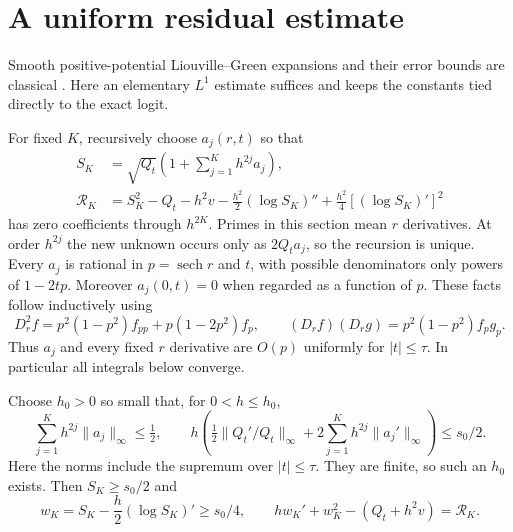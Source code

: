 \documentclass[10pt]{article}
\newcommand{\sech}{\operatorname{sech}}
\begin{document}
\section{A uniform residual estimate}

Smooth positive-potential Liouville--Green expansions and their
error bounds are classical \cite{dlmf,dunster}. Here an elementary
$L^1$ estimate suffices and keeps the constants tied directly to
the exact logit.

For fixed $K$, recursively choose $a_j(r,t)$ so that
\begin{align}
S_K&=\sqrt{Q_t}\left(1+\sum_{j=1}^Kh^{2j}a_j\right),\label{eq:S}\\
\mathcal R_K&=S_K^2-Q_t-h^2v
 -\frac{h^2}2(\log S_K)''
 +\frac{h^2}4[(\log S_K)']^2\label{eq:residual}
\end{align}
has zero coefficients through $h^{2K}$. Primes in this section
mean $r$ derivatives. At order $h^{2j}$ the new unknown occurs
only as $2Q_t a_j$, so the recursion is unique. Every $a_j$ is
rational in $p=\sech r$ and $t$, with possible denominators only
powers of $1-2tp$. Moreover $a_j(0,t)=0$ when regarded as a
function of $p$. These facts follow inductively using
\begin{equation}
D_r^2f=p^2(1-p^2)f_{pp}+p(1-2p^2)f_p,
\qquad (D_rf)(D_rg)=p^2(1-p^2)f_pg_p.
\label{eq:derivativealgebra}
\end{equation}
Thus $a_j$ and every fixed $r$ derivative are $O(p)$ uniformly
for $|t|\le\tau$. In particular all integrals below converge.

Choose $h_0>0$ so small that, for $0<h\le h_0$,
\begin{equation}
\sum_{j=1}^Kh^{2j}\|a_j\|_\infty\le\tfrac12,
\qquad
h\left(\tfrac12\|Q_t'/Q_t\|_\infty+
       2\sum_{j=1}^Kh^{2j}\|a_j'\|_\infty\right)\le s_0/2.
\label{eq:hsmall}
\end{equation}
Here the norms include the supremum over $|t|\le\tau$.
They are finite, so such an $h_0$ exists. Then $S_K\ge s_0/2$ and
\begin{equation}
w_K=S_K-\frac h2(\log S_K)'\ge s_0/4,
\qquad hw_K'+w_K^2-(Q_t+h^2v)=\mathcal R_K.
\label{eq:wK}
\end{equation}
\end{document}
